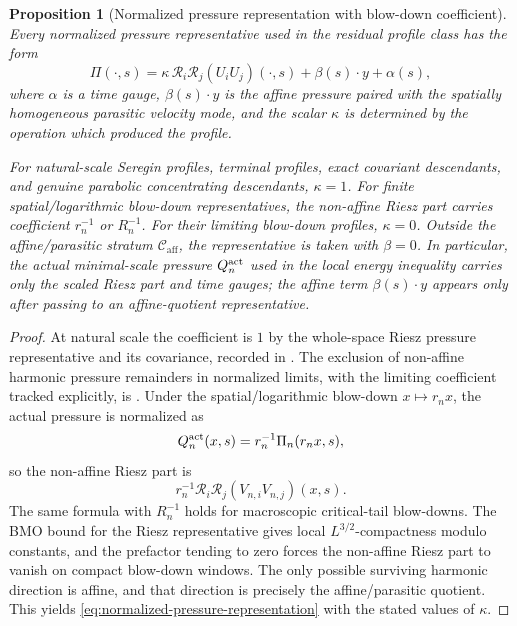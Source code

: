 \documentclass[11pt]{amsart}
\numberwithin{equation}{section}
\theoremstyle{plain}
\newtheorem{proposition}[proposition]{Proposition}
\theoremstyle{definition}
\theoremstyle{remark}
\newcommand{\Caff}{\mathcal C_{\mathrm{aff}}}
\begin{document}
\begin{proposition}[Normalized pressure representation with blow-down coefficient]
\label{prop:normalized-pressure-representation}
Every normalized pressure representative used in the residual profile class has
the form
\begin{equation}\label{eq:normalized-pressure-representation}
   \Pi(\cdot,s)
   =
   \kappa\,\mathcal R_i\mathcal R_j(U_iU_j)(\cdot,s)
   +\beta(s)\cdot y+\alpha(s),
\end{equation}
where \(\alpha\) is a time gauge, \(\beta(s)\cdot y\) is the affine pressure
paired with the spatially homogeneous parasitic velocity mode, and the scalar
\(\kappa\) is determined by the operation which produced the profile.

For natural-scale Seregin profiles, terminal profiles, exact covariant
descendants, and genuine parabolic concentrating descendants, \(\kappa=1\).
For finite spatial/logarithmic blow-down representatives, the non-affine Riesz
part carries coefficient \(r_n^{-1}\) or \(R_n^{-1}\).  For their limiting
blow-down profiles, \(\kappa=0\).  Outside the affine/parasitic
stratum \(\Caff\), the representative is taken with \(\beta=0\).  In
particular, the actual minimal-scale pressure \(Q_n^{\rm act}\) used in the
local energy inequality carries only the scaled Riesz part and time gauges; the
affine term \(\beta(s)\cdot y\) appears only after passing to an affine-quotient
representative.
\end{proposition}

\begin{proof}
At natural scale the coefficient is \(1\) by the whole-space Riesz pressure
representative and its covariance, recorded in
.  The exclusion of non-affine
harmonic pressure remainders in normalized limits, with the limiting
coefficient tracked explicitly, is
.  Under the spatial/logarithmic
blow-down \(x\mapsto r_nx\), the actual pressure is normalized as
\[
   Q_n^{\rm act}(x,s)=r_n^{-1}\Pi_n(r_nx,s),
\]
so the non-affine Riesz part is
\[
   r_n^{-1}\mathcal R_i\mathcal R_j(V_{n,i}V_{n,j})(x,s).
\]
The same formula with \(R_n^{-1}\) holds for macroscopic critical-tail
blow-downs.  The BMO bound for the Riesz representative gives local
\(L^{3/2}\)-compactness modulo constants, and the prefactor tending to zero
forces the non-affine Riesz part to vanish on compact blow-down windows.  The
only possible surviving harmonic direction is affine, and that direction is
precisely the affine/parasitic quotient.  This yields
\eqref{eq:normalized-pressure-representation} with the stated values of
\(\kappa\).
\end{proof}
\end{document}
